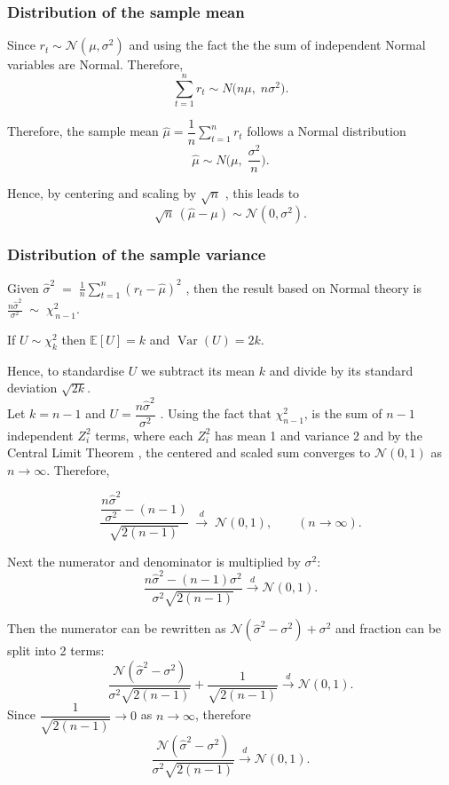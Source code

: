 \documentclass[
  12pt,
]{article}
\begin{document}
\subsubsection{Distribution of the sample
mean}\label{distribution-of-the-sample-mean}

Since \(r_t\sim \mathcal{N}(\mu,\sigma^2)\) and using the fact the the
sum of independent Normal variables are Normal. Therefore,\[
\sum_{t=1}^n r_t \sim N\!\big(n\mu,\; n\sigma^2\big). \tag{1}
\]

Therefore, the sample mean \(\widehat\mu=\dfrac{1}{n}\sum_{t=1}^n r_t\)
follows a Normal distribution \[
\widehat\mu \sim N\!\Big(\mu,\; \frac{\sigma^2}{n}\Big). \tag{2}
\]

Hence, by centering and scaling by \(\sqrt{n}\) , this leads to \[
\sqrt{n}\,(\widehat\mu-\mu) \sim \mathcal{N}(0,\sigma^2). \tag{3}
\]

\subsubsection{Distribution of the sample
variance}\label{distribution-of-the-sample-variance}

Given
\(\widehat\sigma^2 \;=\; \frac{1}{n}\sum_{t=1}^n (r_t - \widehat\mu)^2\)
, then the result based on Normal theory is
\(\frac{n\widehat\sigma^2}{\sigma^2} \;\sim\; \chi^2_{\,n-1}.\)

If \(U \sim \chi^2_k\) then \(\mathbb{E}[U]=k\) and
\(\operatorname{Var}(U)=2k.\)

Hence, to standardise \(U\) we subtract its mean \(k\) and divide by its
standard deviation \(\sqrt{2k}\).\\
Let \(k=n-1\) and \(U = \dfrac{n\widehat\sigma^2}{\sigma^2}\) . Using
the fact that \(\chi_{n-1}^2\), is the sum of \(n-1\) independent
\(Z_i^2\) terms, where each \(Z_i^2\) has mean 1 and variance 2 and by
the Central Limit Theorem , the centered and scaled sum converges to
\(\mathcal{N}(0,1)\) as \(n \to \infty\). Therefore,

\[
\frac{\dfrac{n\widehat\sigma^2}{\sigma^2}-(n-1)}{\sqrt{2(n-1)}} \;\xrightarrow{d}\; \mathcal{N}(0,1), \qquad (n\to\infty)   \tag{4}.
\]

Next the numerator and denominator is multiplied by \(\sigma^2\): \[
\frac{n\widehat\sigma^2-(n-1)\sigma^2}{\sigma^2\sqrt{2(n-1)}} \xrightarrow{d} \mathcal{N}(0,1) \tag{5}.
\]

Then the numerator can be rewritten as
\(\mathcal{N}(\widehat\sigma^2-\sigma^2)+\sigma^2\) and fraction can be
split into 2 terms: \[
\frac{\mathcal{N}(\widehat\sigma^2-\sigma^2)}{\sigma^2\sqrt{2(n-1)}} + \frac{1}{\sqrt{2(n-1)}} \xrightarrow{d} \mathcal{N}(0,1) \tag{6}.
\] Since \(\dfrac{1}{\sqrt{2(n-1)}}\to 0\) as \(n\to\infty\), therefore
\[
\frac{\mathcal{N}(\widehat\sigma^2-\sigma^2)}{\sigma^2\sqrt{2(n-1)}} \xrightarrow{d} \mathcal{N}(0,1) \tag{7}.
\]
\end{document}
